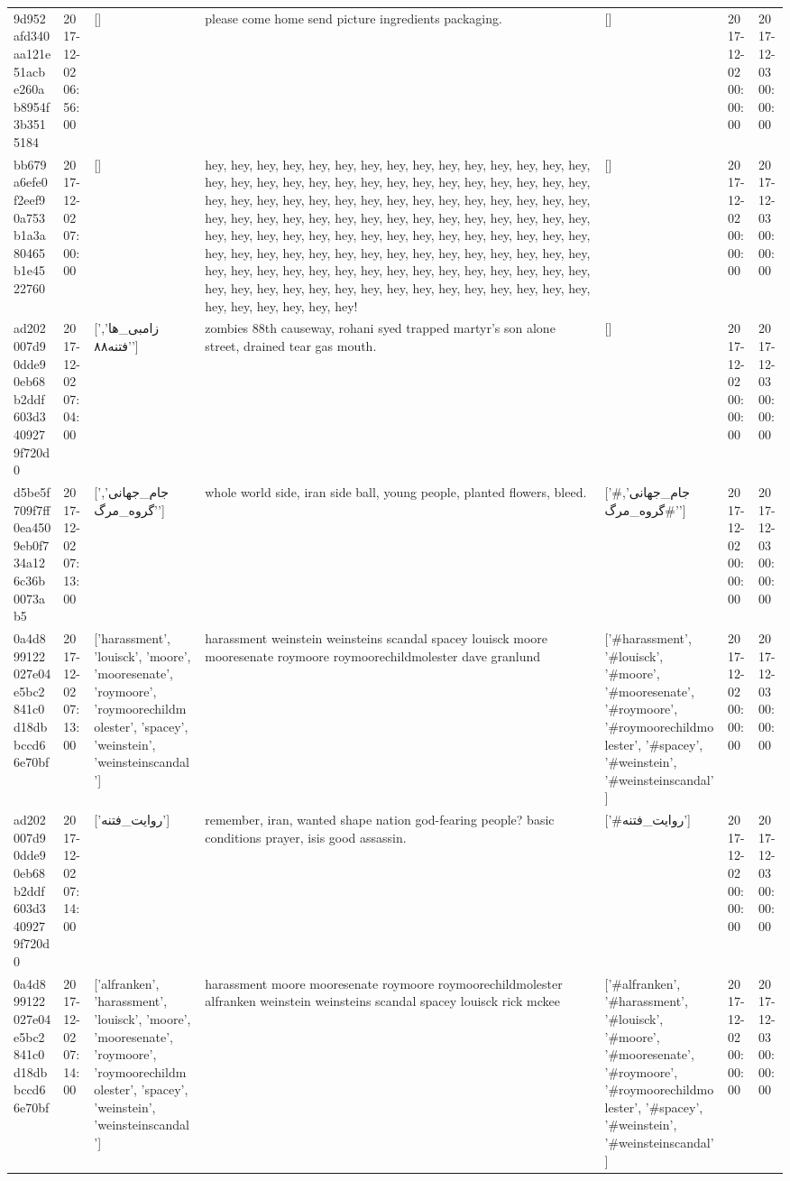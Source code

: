 \begin{tabular}{lllllll}
9d952afd340aa121e51acbe260ab8954f3b3515184 & 2017-12-02 06:56:00 & [] & please come home send picture ingredients packaging. & [] & 2017-12-02 00:00:00 & 2017-12-03 00:00:00 \\
bb679a6efe0f2eef90a753b1a3a80465b1e4522760 & 2017-12-02 07:00:00 & [] & hey, hey, hey, hey, hey, hey, hey, hey, hey, hey, hey, hey, hey, hey, hey, hey, hey, hey, hey, hey, hey, hey, hey, hey, hey, hey, hey, hey, hey, hey, hey, hey, hey, hey, hey, hey, hey, hey, hey, hey, hey, hey, hey, hey, hey, hey, hey, hey, hey, hey, hey, hey, hey, hey, hey, hey, hey, hey, hey, hey, hey, hey, hey, hey, hey, hey, hey, hey, hey, hey, hey, hey, hey, hey, hey, hey, hey, hey, hey, hey, hey, hey, hey, hey, hey, hey, hey, hey, hey, hey, hey, hey, hey, hey, hey, hey, hey, hey, hey, hey, hey, hey, hey, hey, hey, hey, hey, hey, hey, hey, hey, hey, hey, hey, hey, hey, hey, hey, hey, hey, hey, hey, hey, hey, hey, hey! & [] & 2017-12-02 00:00:00 & 2017-12-03 00:00:00 \\
ad202007d90dde90eb68b2ddf603d3409279f720d0 & 2017-12-02 07:04:00 & ['زامبی_ها', 'فتنه٨٨'] & zombies 88th causeway, rohani syed trapped martyr's son alone street, drained tear gas mouth. & [] & 2017-12-02 00:00:00 & 2017-12-03 00:00:00 \\
d5be5f709f7ff0ea4509eb0f734a126c36b0073ab5 & 2017-12-02 07:13:00 & ['جام_جهانی', 'گروه_مرگ'] & whole world side, iran side ball, young people, planted flowers, bleed. & ['#جام_جهانی', '#گروه_مرگ'] & 2017-12-02 00:00:00 & 2017-12-03 00:00:00 \\
0a4d899122027e04e5bc2841c0d18dbbccd66e70bf & 2017-12-02 07:13:00 & ['harassment', 'louisck', 'moore', 'mooresenate', 'roymoore', 'roymoorechildmolester', 'spacey', 'weinstein', 'weinsteinscandal'] & harassment weinstein weinsteins scandal spacey louisck moore mooresenate roymoore roymoorechildmolester dave granlund & ['#harassment', '#louisck', '#moore', '#mooresenate', '#roymoore', '#roymoorechildmolester', '#spacey', '#weinstein', '#weinsteinscandal'] & 2017-12-02 00:00:00 & 2017-12-03 00:00:00 \\
ad202007d90dde90eb68b2ddf603d3409279f720d0 & 2017-12-02 07:14:00 & ['روایت_فتنه'] & remember, iran, wanted shape nation god-fearing people? basic conditions prayer, isis good assassin. & ['#روایت_فتنه'] & 2017-12-02 00:00:00 & 2017-12-03 00:00:00 \\
0a4d899122027e04e5bc2841c0d18dbbccd66e70bf & 2017-12-02 07:14:00 & ['alfranken', 'harassment', 'louisck', 'moore', 'mooresenate', 'roymoore', 'roymoorechildmolester', 'spacey', 'weinstein', 'weinsteinscandal'] & harassment moore mooresenate roymoore roymoorechildmolester alfranken weinstein weinsteins scandal spacey louisck rick mckee & ['#alfranken', '#harassment', '#louisck', '#moore', '#mooresenate', '#roymoore', '#roymoorechildmolester', '#spacey', '#weinstein', '#weinsteinscandal'] & 2017-12-02 00:00:00 & 2017-12-03 00:00:00 \\

\end{tabular}

